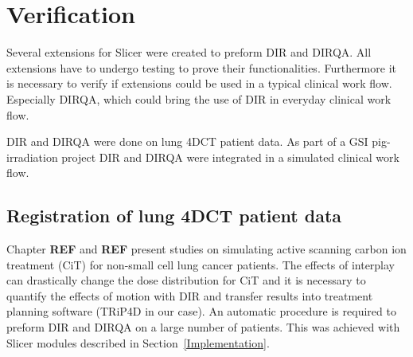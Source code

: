 \documentclass[type=dr, dr=rernat, accentcolor=tud7b,colorbacktitle, bigchapter, openright, twoside, 12pt ]{tudthesis}
\begin{document}
% 
% 


\newpage
\section{Verification}
\label{Verification}

Several extensions for Slicer were created to preform DIR and DIRQA. All extensions have to undergo testing to prove their functionalities. Furthermore it is necessary to verify if extensions could be used in a typical clinical work flow. Especially DIRQA, which could bring the use of DIR in everyday clinical work flow.

DIR and DIRQA were done on lung 4DCT patient data. As part of a GSI pig-irradiation project \cite{Lehmann2015} DIR and DIRQA were integrated in a simulated clinical work flow. 

\subsection{Registration of lung 4DCT patient data}
\label{lungDIR}

Chapter \textbf{REF} and \textbf{REF} present studies on simulating active scanning carbon ion treatment (CiT) for non-small cell lung cancer patients. The effects of interplay can drastically change the dose distribution for CiT and it is necessary to quantify the effects of motion with DIR and transfer results into treatment planning software (TRiP4D in our case). An automatic procedure is required to preform DIR and DIRQA on a large number of patients. This was achieved with Slicer modules described in Section~\ref{Implementation}.
\end{document}
